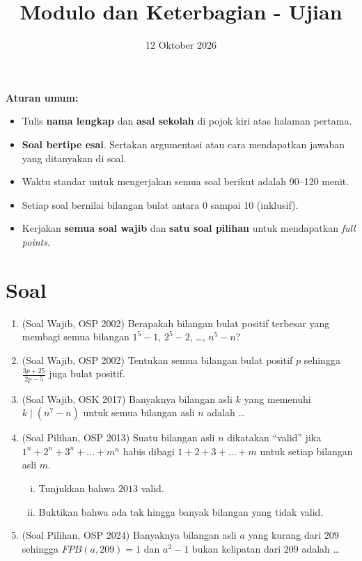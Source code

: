 \documentclass[12pt]{scrartcl}
\title{Modulo dan Keterbagian - Ujian}
\date{12 Oktober 2026}
\begin{document}
\maketitle

\renewcommand*\contentsname{Daftar Isi}
\tableofcontents

\newpage
\textbf{Aturan umum:}
\begin{itemize}
	\item Tulis \textbf{nama lengkap} dan \textbf{asal sekolah} di pojok kiri atas halaman pertama.
	\item \textbf{Soal bertipe esai}. Sertakan argumentasi atau cara mendapatkan jawaban yang ditanyakan di soal.
	\item Waktu standar untuk mengerjakan semua soal berikut adalah 90--120 menit.
	\item Setiap soal bernilai bilangan bulat antara 0 sampai 10 (inklusif).
	\item Kerjakan \textbf{semua soal wajib} dan \textbf{satu soal pilihan} untuk mendapatkan \textit{full points}.
\end{itemize}

\section{Soal}
\begin{enumerate}

	\item (Soal Wajib, OSP 2002) Berapakah bilangan bulat positif terbesar yang membagi semua bilangan
	$1^5 - 1$, $2^5 - 2$, \dots, $n^5 - n$?

	\item (Soal Wajib, OSP 2002) Tentukan semua bilangan bulat positif $p$ sehingga
	$\frac{3p + 25}{2p - 5}$ juga bulat positif.

	\item (Soal Wajib, OSK 2017) Banyaknya bilangan asli $k$ yang memenuhi $k \mid (n^7 - n)$
	untuk semua bilangan asli $n$ adalah \dots

	\item (Soal Pilihan, OSP 2013) Suatu bilangan asli $n$ dikatakan ``valid'' jika
	$1^n + 2^n + 3^n + \dots + m^n$ habis dibagi $1 + 2 + 3 + \dots + m$
	untuk setiap bilangan asli $m$.
	\begin{enumerate}[(i)]
		\item Tunjukkan bahwa $2013$ valid.
		\item Buktikan bahwa ada tak hingga banyak bilangan yang tidak valid.
	\end{enumerate}

	\item (Soal Pilihan, OSP 2024) Banyaknya bilangan asli $a$ yang kurang dari $209$ sehingga
	$FPB(a, 209) = 1$ dan $a^2 - 1$ bukan kelipatan dari $209$ adalah \dots

\end{enumerate}
\end{document}
